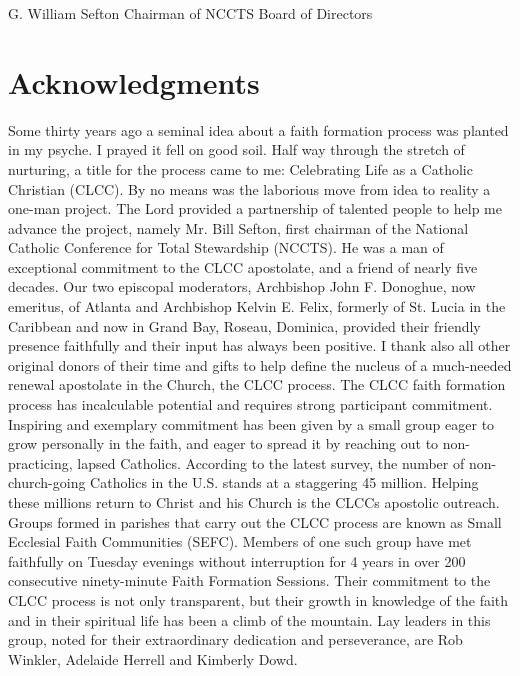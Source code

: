 \documentclass[oneside]{book}
\begin{document}
G. William Sefton Chairman of NCCTS Board of Directors


\chapter{Acknowledgments}

Some thirty years ago a seminal idea about a faith formation process was planted
in my psyche. I prayed it fell on good soil. Half way through the stretch of
nurturing, a title for the process came to me: Celebrating Life as a Catholic
Christian (CLCC). By no means was the laborious move from idea to reality a
one-man project. The Lord provided a partnership of talented people to help me
advance the project, namely Mr. Bill Sefton, first chairman of the National
Catholic Conference for Total Stewardship (NCCTS). He was a man of exceptional
commitment to the CLCC apostolate, and a friend of nearly five decades. Our two
episcopal moderators, Archbishop John F. Donoghue, now emeritus, of Atlanta and
Archbishop Kelvin E. Felix, formerly of St. Lucia in the Caribbean and now in
Grand Bay, Roseau, Dominica, provided their friendly presence faithfully and
their input has always been positive. I thank also all other original donors of
their time and gifts to help define the nucleus of a much-needed renewal
apostolate in the Church, the CLCC process.  The CLCC faith formation process
has incalculable potential and requires strong participant commitment. Inspiring
and exemplary commitment has been given by a small group eager to grow
personally in the faith, and eager to spread it by reaching out to
non-practicing, lapsed Catholics. According to the latest survey, the number of
non-church-going Catholics in the U.S. stands at a staggering 45
million. Helping these millions return to Christ and his Church is the CLCCs
apostolic outreach. Groups formed in parishes that carry out the CLCC process
are known as Small Ecclesial Faith Communities (SEFC). Members of one such group
have met faithfully on Tuesday evenings without interruption for 4 years in over
200 consecutive ninety-minute Faith Formation Sessions. Their commitment to the
CLCC process is not only transparent, but their growth in knowledge of the faith
and in their spiritual life has been a climb of the mountain. Lay leaders in
this group, noted for their extraordinary dedication and perseverance, are Rob
Winkler, Adelaide Herrell and Kimberly Dowd.
\end{document}
